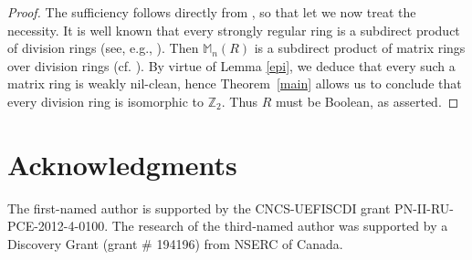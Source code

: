\documentclass[12]{amsart}
\theoremstyle{definition}
\numberwithin{equation}{section}
\begin{document}
\begin{proof} The sufficiency follows directly from \cite{BCDM13}, so that let we now treat the necessity. It is well known that every strongly regular ring is a subdirect product of division rings (see, e.g., \cite{L01}). Then $\mathbb{M}_n(R)$ is a subdirect product of matrix rings over division rings (cf. \cite{L01}). By virtue of Lemma \ref{epi}, we deduce that every such a matrix ring is weakly nil-clean, hence Theorem~\ref{main} allows us to conclude that every division ring is isomorphic to ${{\mathbb Z}}_2$. Thus $R$ must be Boolean, as asserted.
\end{proof}

\section*{Acknowledgments} The first-named author is supported by the CNCS-UEFISCDI grant PN-II-RU-PCE-2012-4-0100. The research of the third-named author was supported by a Discovery Grant (grant \# 194196) from NSERC of Canada.
\end{document}
